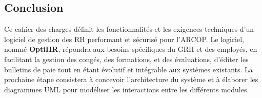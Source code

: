 \subsection{Conclusion}
Ce cahier des charges définit les fonctionnalités et les exigences techniques d'un logiciel de gestion des \ac{RH} performant et sécurisé pour l'\ac{ARCOP}. Le logiciel, nommé \textbf{OptiHR}, répondra aux besoins spécifiques du GRH et des employés, en facilitant la gestion des congés, des formations, et des évaluations, d'éditer les bulletins de paie tout en étant évolutif et intégrable aux systèmes existants. La prochaine étape consistera à concevoir l'architecture du système et à élaborer les diagrammes UML pour modéliser les interactions entre les différents modules.
\clearpage
